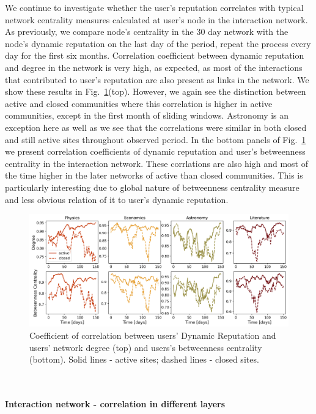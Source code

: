 We continue to investigate whether the user's reputation correlates with typical network centrality measures calculated at user's node in the interaction network. As previously, we compare node's centrality in the 30 day network with the node's dynamic reputation on the last day of the period, repeat the process every day for the first six months. 
Correlation coefficient between dynamic reputation and degree in the network is very high, as expected, as most of the interactions that contributed to user's reputation are also present as links in the network. We show these results in Fig.~\ref{fig:dyn_rep_centrality}(top). However, we again see the distinction between active and closed communities where this correlation is higher in active communities, except in the first month of sliding windows. Astronomy is an exception here as well as we see that the correlations were similar in both closed and still active sites throughout observed period. 
In the bottom panels of Fig.~\ref{fig:dyn_rep_centrality} we present correlation coefficients of dynamic reputation and user's betweenness centrality in the interaction network. These corrlations are also high and most of the time higher in the later networks of active than closed communities. This is particularly interesting due to global nature of betweenness centrality measure and less obvious relation of it to user's dynamic reputation.
\begin{figure}[h!]
	\centering
	\includegraphics[width=\linewidth]{Figures/FigA7.png}
	\caption{Coefficient of correlation between users' Dynamic Reputation and users' network degree (top) and users's betweenness centrality (bottom). Solid lines - active sites; dashed lines - closed sites.}
	\label{fig:dyn_rep_centrality}
\end{figure}
\\~\\
\textbf{Interaction network - correlation in different layers}

